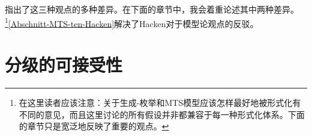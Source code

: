 \citet{PS2001a} 指出了这三种观点的多种差异。在下面的章节中，我会着重论述其中两种差异。 \footnote{%
	在这里读者应该注意：关于生成-枚举和MTS模型应该怎样最好地被形式化有不同的意见，而且这里讨论的所有假设并非都兼容于每一种形式化体系。下面的章节只是宽泛地反映了重要的观点。%
}\ref{Abschnitt-MTS-ten-Hacken}解决了Hacken对于模型论观点的反驳。

\section{分级的可接受性}

